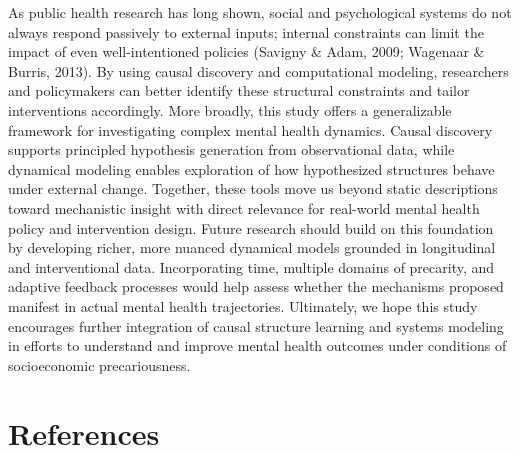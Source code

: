 \documentclass[
]{article}
\begin{document}
As public health research has long shown, social and psychological
systems do not always respond passively to external inputs; internal
constraints can limit the impact of even well-intentioned policies
(Savigny \& Adam, 2009; Wagenaar \& Burris, 2013). By using causal
discovery and computational modeling, researchers and policymakers can
better identify these structural constraints and tailor interventions
accordingly. More broadly, this study offers a generalizable framework
for investigating complex mental health dynamics. Causal discovery
supports principled hypothesis generation from observational data, while
dynamical modeling enables exploration of how hypothesized structures
behave under external change. Together, these tools move us beyond
static descriptions toward mechanistic insight with direct relevance for
real-world mental health policy and intervention design. Future research
should build on this foundation by developing richer, more nuanced
dynamical models grounded in longitudinal and interventional data.
Incorporating time, multiple domains of precarity, and adaptive feedback
processes would help assess whether the mechanisms proposed manifest in
actual mental health trajectories. Ultimately, we hope this study
encourages further integration of causal structure learning and systems
modeling in efforts to understand and improve mental health outcomes
under conditions of socioeconomic precariousness.

\section{References}\label{references}
\end{document}
